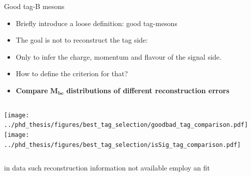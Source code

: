 \documentclass[xcolor=dvipsnames]{beamer}
\begin{document}
   \begin{frame}{Good tag-B mesons}
      \centering\scriptsize
      \begin{itemize}
         \item Briefly introduce a loose definition: good tag-\B mesons
         \item The goal is not to reconstruct the tag side:
         \item Only to infer the charge, momentum and flavour of the signal side.
         \item How to define the criterion for that?
         \item[\ra] \textbf{Compare} $\bm{M_{bc}}$ \textbf{distributions of different reconstruction errors}
      \end{itemize}
   
      \begin{columns}
         \centering
         \texttt{[image: ../phd\_thesis/figures/best\_tag\_selection/goodbad\_tag\_comparison.pdf]}
         \centering
         \texttt{[image: ../phd\_thesis/figures/best\_tag\_selection/isSig\_tag\_comparison.pdf]}
      \end{columns}
   
      \ra in data such reconstruction information not available
      \ra employ an \Mbc fit
   
   \end{frame}
   
\end{document}

